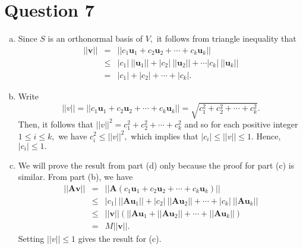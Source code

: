 \documentclass{article}
\newcommand{\matr}[1]{\mathbf{#1}}
\begin{document}
\section*{Question 7}
\begin{enumerate}[(a)]
    \item Since $S$ is an orthonormal basis of $V,$ it follows from triangle inequality that \begin{eqnarray*}
    ||\matr{v}||&=&||c_1\matr{u}_1+c_2\matr{u}_2+\cdots+c_k\matr{u}_k||\\
    &\leq&|c_1|\ ||\matr{u}_1||+|c_2|\ ||\matr{u}_2||+\cdots|c_k|\ ||\matr{u}_k||\\
    &=&|c_1|+|c_2|+\cdots+|c_k|.
    \end{eqnarray*}
    \item Write $$||v||=||c_1\matr{u}_1+c_2\matr{u}_2+\cdots+c_k\matr{u}_k||=\sqrt{c_1^2+c^2_2+\cdots+c_k^2}.$$
    Then, it follows that $||v||^2=c_1^2+c_2^2+\cdots+c_k^2$ and so for each positive integer $1\leq i\leq k,$ we have $c_i^2\leq ||v||^2,$ which implies that $|c_i|\leq ||v||\leq 1.$ Hence, $|c_i|\leq 1.$
    \setcounter{enumi}{3}
    \item We will prove the result from part (d) only because the proof for part (c) is similar. From part (b), we have
    \begin{eqnarray*}
    ||\matr{Av}||&=&||\matr{A}(c_1\matr{u}_1+c_2\matr{u}_2+\cdots+c_k\matr{u}_k)||\\
    &\leq&|c_1|\ ||\matr{Au}_1||+|c_2|\ ||\matr{Au}_2||+\cdots+|c_k|\ ||\matr{Au}_k||\\
    &\leq&||\matr{v}||\left(||\matr{Au}_1+||\matr{Au}_2||+\cdots+||\matr{Au}_k||\right)\\
    &=&M||\matr{v}||.
    \end{eqnarray*}
    Setting $||v|| \leq 1$ gives the result for (c).
\end{enumerate}
\end{document}
